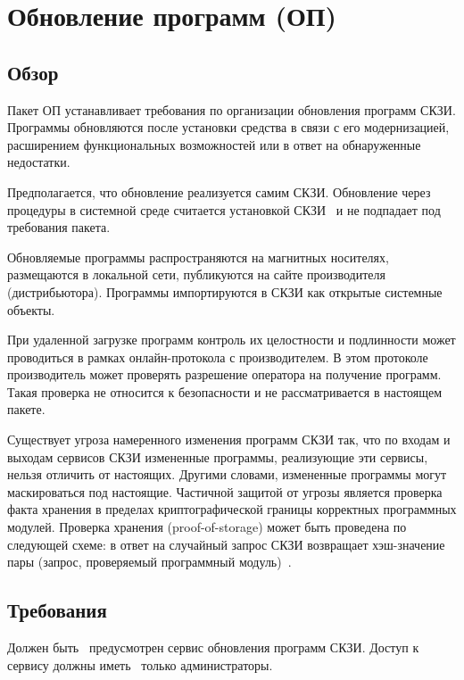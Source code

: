 \section{Обновление программ (ОП)}\label{SU}

\subsection{Обзор}\label{SU.Intro}

Пакет ОП устанавливает требования по организации обновления программ СКЗИ.
Программы обновляются после установки средства в связи с его модернизацией, 
расширением функциональных возможностей или в ответ на обнаруженные недостатки.

Предполагается, что обновление реализуется самим СКЗИ. Обновление через 
процедуры в системной среде считается установкой СКЗИ~ 
и не подпадает под требования пакета.

Обновляемые программы распространяются на магнитных носителях,
размещаются в локальной сети, публикуются на сайте производителя
(дистрибьютора).
%
Программы импортируются в СКЗИ как открытые системные объекты.

При удаленной загрузке программ контроль их целостности и подлинности 
может проводиться в рамках онлайн-протокола с производителем. В этом протоколе
производитель может проверять разрешение оператора на получение программ. 
Такая проверка не относится к безопасности и не рассматривается в настоящем 
пакете.

Существует угроза намеренного изменения программ СКЗИ так, что по
входам и выходам сервисов СКЗИ измененные программы, реализующие эти сервисы, 
нельзя отличить от настоящих. Другими словами, измененные программы могут 
маскироваться под настоящие. Частичной защитой от угрозы является проверка 
факта хранения в пределах криптографической границы корректных программных 
модулей. Проверка хранения (proof-of-storage) может быть проведена по следующей 
схеме: в ответ на случайный запрос СКЗИ возвращает хэш-значение пары (запрос, 
проверяемый программный модуль)~.

\subsection{Требования}\label{SU.Reqs}

\label{R.SU.Service}
Должен быть~ предусмотрен сервис обновления 
программ СКЗИ. Доступ к сервису должны иметь~ 
только администраторы.

